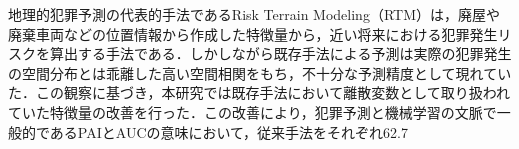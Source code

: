 地理的犯罪予測の代表的手法であるRisk Terrain Modeling（RTM）は，廃屋や廃棄車両などの位置情報から作成した特徴量から，近い将来における犯罪発生リスクを算出する手法である．しかしながら既存手法による予測は実際の犯罪発生の空間分布とは乖離した高い空間相関をもち，不十分な予測精度として現れていた．この観察に基づき，本研究では既存手法において離散変数として取り扱われていた特徴量の改善を行った．この改善により，犯罪予測と機械学習の文脈で一般的であるPAIとAUCの意味において，従来手法をそれぞれ62.7%
